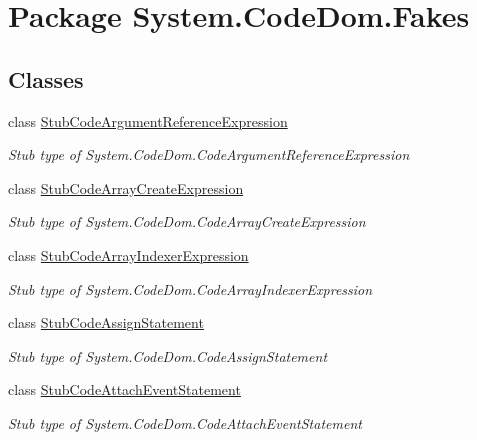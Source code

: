 \hypertarget{namespace_system_1_1_code_dom_1_1_fakes}{\section{Package System.\-Code\-Dom.\-Fakes}
\label{namespace_system_1_1_code_dom_1_1_fakes}
}
\subsection*{Classes}
\begin{DoxyCompactItemize}
\item 
class \hyperlink{class_system_1_1_code_dom_1_1_fakes_1_1_stub_code_argument_reference_expression}{Stub\-Code\-Argument\-Reference\-Expression}
\begin{DoxyCompactList}\small\item\em Stub type of System.\-Code\-Dom.\-Code\-Argument\-Reference\-Expression\end{DoxyCompactList}\item 
class \hyperlink{class_system_1_1_code_dom_1_1_fakes_1_1_stub_code_array_create_expression}{Stub\-Code\-Array\-Create\-Expression}
\begin{DoxyCompactList}\small\item\em Stub type of System.\-Code\-Dom.\-Code\-Array\-Create\-Expression\end{DoxyCompactList}\item 
class \hyperlink{class_system_1_1_code_dom_1_1_fakes_1_1_stub_code_array_indexer_expression}{Stub\-Code\-Array\-Indexer\-Expression}
\begin{DoxyCompactList}\small\item\em Stub type of System.\-Code\-Dom.\-Code\-Array\-Indexer\-Expression\end{DoxyCompactList}\item 
class \hyperlink{class_system_1_1_code_dom_1_1_fakes_1_1_stub_code_assign_statement}{Stub\-Code\-Assign\-Statement}
\begin{DoxyCompactList}\small\item\em Stub type of System.\-Code\-Dom.\-Code\-Assign\-Statement\end{DoxyCompactList}\item 
class \hyperlink{class_system_1_1_code_dom_1_1_fakes_1_1_stub_code_attach_event_statement}{Stub\-Code\-Attach\-Event\-Statement}
\begin{DoxyCompactList}\small\item\em Stub type of System.\-Code\-Dom.\-Code\-Attach\-Event\-Statement\end{DoxyCompactList}\item 

\end{DoxyCompactItemize}
